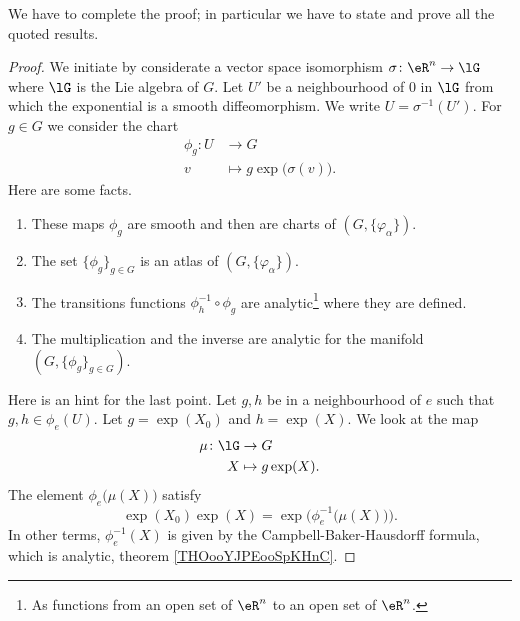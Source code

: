 \begin{probleme}
	We have to complete the proof; in particular we have to state and prove all the quoted results.
\end{probleme}


\begin{proof}
	We initiate by considerate a vector space isomorphism \( \sigma\colon \eR^n\to \lG\) where \( \lG\) is the Lie algebra of \( G\). Let \( U'\) be a neighbourhood of \( 0\) in \( \lG\) from which the exponential is a smooth diffeomorphism. We write \( U=\sigma^{-1}(U')\). For \( g\in G\) we consider the chart
	\begin{equation}
		\begin{aligned}
			\phi_g\colon U & \to G                               \\
			v              & \mapsto g\exp\big( \sigma(v) \big).
		\end{aligned}
	\end{equation}
	Here are some facts.
	\begin{enumerate}
		\item
		      These maps \( \phi_g\) are smooth and then are charts of \( (G,\{ \varphi_{\alpha} \})\).
		\item
		      The set \( \{ \phi_g \}_{g\in G}\) is an atlas of \( (G,\{ \varphi_{\alpha} \})\).
		\item
		      The transitions functions \( \phi_h^{-1}\circ\phi_g\) are analytic\footnote{As functions from an open set of \( \eR^n\) to an open set of \( \eR^n\).} where they are defined.
		\item
		      The multiplication and the inverse are analytic for the manifold \( (G,\{ \phi_g \}_{g\in G})\).
	\end{enumerate}
	Here is an hint for the last point. Let \( g,h\) be in a neighbourhood of \( e\) such that \( g,h\in \phi_e(U)\). Let \( g=\exp(X_0)\) and \( h=\exp(X)\). We look at the map
	\begin{equation}
		\begin{aligned}
			\mu\colon \lG & \to G             \\
			X             & \mapsto g\exp(X).
		\end{aligned}
	\end{equation}
	The element \( \phi_e\big( \mu(X) \big)\) satisfy
	\begin{equation}
		\exp(X_0)\exp(X)=\exp\Big( \phi_e^{-1}\big( \mu(X) \big) \Big).
	\end{equation}
	In other terms, \( \phi_e^{-1}(X)\) is given by the Campbell-Baker-Hausdorff formula, which is analytic, theorem \ref{THOooYJPEooSpKHnC}.
\end{proof}

